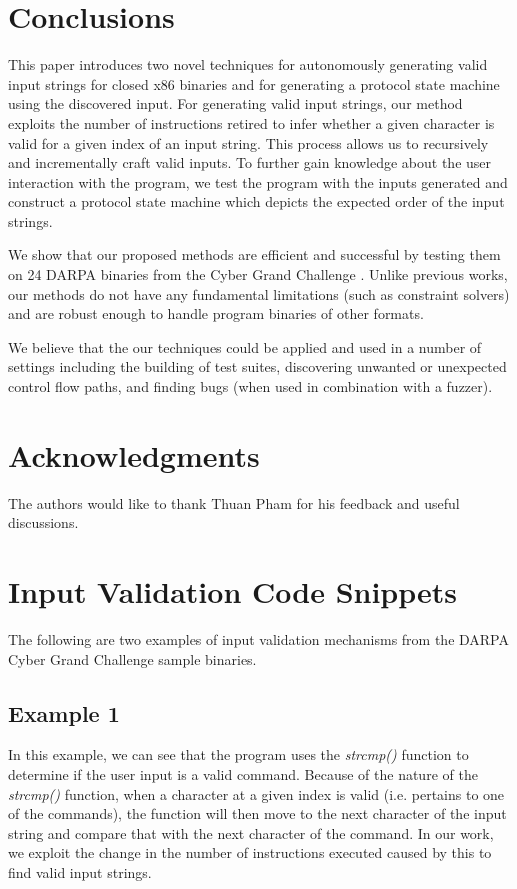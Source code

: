 \documentclass{sig-alternate-05-2015}
\def \numbinaries {24}
\begin{document}
\section{Conclusions}
This paper introduces two novel techniques for autonomously generating valid input strings for closed x86 binaries and for generating a protocol state machine using the discovered input.
For generating valid input strings, our method exploits the number of instructions retired to infer whether a given character is valid for a given index of an input string.
This process allows us to recursively and incrementally craft valid inputs.
To further gain knowledge about the user interaction with the program, we test the program with the inputs generated and construct a protocol state machine which depicts the expected order of the input strings.

We show that our proposed methods are efficient and successful by testing them on \numbinaries{} DARPA binaries from the Cyber Grand Challenge \cite{darpacgc}. 
Unlike previous works, our methods do not have any fundamental limitations (such as constraint solvers) and are robust enough to handle program binaries of other formats.

We believe that the our techniques could be applied and used in a number of settings including the building of test suites, discovering unwanted or unexpected control flow paths, and  finding bugs (when used in combination with a fuzzer).

\section{Acknowledgments}
The authors would like to thank Thuan Pham for his feedback and useful discussions.




\appendix
\section{Input Validation Code Snippets}
The following are two examples of input validation mechanisms from the DARPA Cyber Grand Challenge sample binaries.

\subsection{Example 1}

In this example, we can see that the program uses the \textit{strcmp()} function to determine if the user input is a valid command.
Because of the nature of the \textit{strcmp()} function, when a character at a given index is valid (i.e. pertains to one of the commands), the function will then move to the next character of the input string and compare that with the next character of the command.
In our work, we exploit the change in the number of instructions executed caused by this to find valid input strings.
\end{document}
